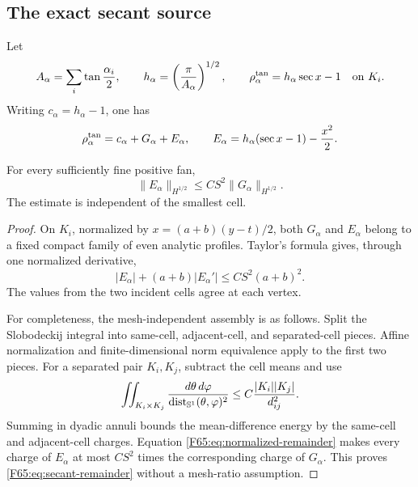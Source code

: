 \subsection{The exact secant source}

Let
\begin{equation}\label{F65:eq:secant}
 A_\alpha=\sum_i\tan\frac{\alpha_i}{2},
 \qquad h_\alpha=\left(\frac\pi{A_\alpha}\right)^{1/2},
 \qquad
 \rho_\alpha^{\rm tan}=h_\alpha\sec x-1
 \quad\hbox{on }K_i.
\end{equation}
Writing $c_\alpha=h_\alpha-1$, one has
\begin{equation}\label{F65:eq:secant-split}
 \rho_\alpha^{\rm tan}=c_\alpha+G_\alpha+E_\alpha,
 \qquad
 E_\alpha=h_\alpha(\sec x-1)-\frac{x^2}{2}.
\end{equation}

\begin{lemma}\label{F65:lem:secant-remainder}
For every sufficiently fine positive fan,
\begin{equation}\label{F65:eq:secant-remainder}
 \|E_\alpha\|_{H^{1/2}}
 \le CS^2\|G_\alpha\|_{H^{1/2}}.
\end{equation}
The estimate is independent of the smallest cell.
\end{lemma}

\begin{proof}
On $K_i$, normalized by $x=(a+b)(y-t)/2$, both $G_\alpha$ and
$E_\alpha$ belong to a fixed compact family of even analytic profiles.
Taylor's formula gives, through one normalized derivative,
\begin{equation}\label{F65:eq:normalized-remainder}
 |E_\alpha|+(a+b)|E_\alpha'|
 \le CS^2(a+b)^2.
\end{equation}
The values from the two incident cells agree at each vertex.

For completeness, the mesh-independent assembly is as follows.  Split the
Slobodeckij integral into same-cell, adjacent-cell, and separated-cell
pieces.  Affine normalization and finite-dimensional norm equivalence apply
to the first two pieces.  For a separated pair $K_i,K_j$, subtract the cell
means and use
\begin{equation}
 \iint_{K_i\times K_j}\frac{d\theta\,d\varphi}
 {\operatorname {dist}_{\mathbb S^1}(\theta,\varphi)^2}
 \le C\frac{|K_i||K_j|}{d_{ij}^2}.
\end{equation}
Summing in dyadic annuli bounds the mean-difference energy by the same-cell
and adjacent-cell charges.  Equation \eqref{F65:eq:normalized-remainder} makes
every charge of $E_\alpha$ at most $CS^2$ times the corresponding charge of
$G_\alpha$.  This proves \eqref{F65:eq:secant-remainder} without a mesh-ratio
assumption.
\end{proof}

